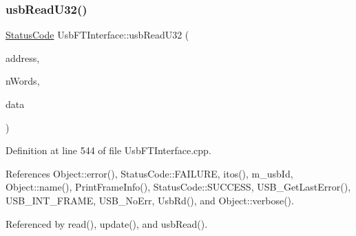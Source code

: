 \subsubsection{\texorpdfstring{usb\+Read\+U32()}{usbReadU32()}}
{\footnotesize\ttfamily \hyperlink{classStatusCode}{Status\+Code} Usb\+F\+T\+Interface\+::usb\+Read\+U32 (\begin{DoxyParamCaption}\item[{unsigned long int}]{address,  }\item[{unsigned long int}]{n\+Words,  }\item[{unsigned long $\ast$}]{data }\end{DoxyParamCaption})}



Definition at line 544 of file Usb\+F\+T\+Interface.\+cpp.



References Object\+::error(), Status\+Code\+::\+F\+A\+I\+L\+U\+RE, itos(), m\+\_\+usb\+Id, Object\+::name(), Print\+Frame\+Info(), Status\+Code\+::\+S\+U\+C\+C\+E\+SS, U\+S\+B\+\_\+\+Get\+Last\+Error(), U\+S\+B\+\_\+\+I\+N\+T\+\_\+\+F\+R\+A\+ME, U\+S\+B\+\_\+\+No\+Err, Usb\+Rd(), and Object\+::verbose().



Referenced by read(), update(), and usb\+Read().


